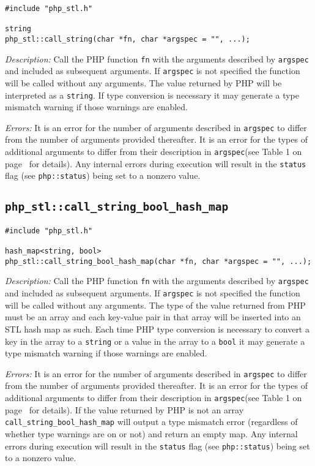 \documentclass[11pt,titlepage]{article}
\begin{document}
\begin{verbatim}
#include "php_stl.h"

string 
php_stl::call_string(char *fn, char *argspec = "", ...);
\end{verbatim}

\emph{Description:} Call the PHP function \verb|fn| with the arguments described by \verb|argspec| and included as subsequent arguments. If \verb|argspec| is not specified the function will be called without any arguments. The value returned by PHP will be interpreted as a \verb|string|. If type conversion is necessary it may generate a type mismatch warning if those warnings are enabled.

\emph{Errors:} It is an error for the number of arguments described in \verb|argspec| to differ from the number of arguments provided thereafter. It is an error for the types of additional arguments to differ from their description in \verb|argspec|(see Table 1 on page~\pageref{Table1} for details). Any internal errors during execution will result in the \verb|status| flag (see \verb|php::status|) being set to a nonzero value.


\subsection{\texttt{php\_stl::call\_string\_bool\_hash\_map}}

\begin{verbatim}
#include "php_stl.h"

hash_map<string, bool> 
php_stl::call_string_bool_hash_map(char *fn, char *argspec = "", ...);
\end{verbatim}

\emph{Description:} Call the PHP function \verb|fn| with the arguments described by \verb|argspec| and included as subsequent arguments. If \verb|argspec| is not specified the function will be called without any arguments. The type of the value returned from PHP must be an array and each key-value pair in that array will be inserted into an STL hash map as such. Each time PHP type conversion is necessary to convert a key in the array to a \verb|string| or a value in the array to a \verb|bool| it may generate a type mismatch warning if those warnings are enabled.

\emph{Errors:} It is an error for the number of arguments described in \verb|argspec| to differ from the number of arguments provided thereafter. It is an error for the types of additional arguments to differ from their description in \verb|argspec|(see Table 1 on page~\pageref{Table1} for details). If the value returned by PHP is not an array \verb|call_string_bool_hash_map| will output a type mismatch error (regardless of whether type warnings are on or not) and return an empty map. Any internal errors during execution will result in the \verb|status| flag (see \verb|php::status|) being set to a nonzero value.
\end{document}
